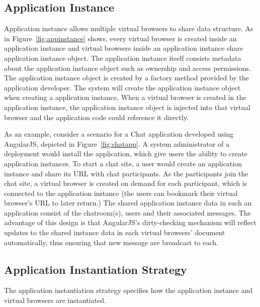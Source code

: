 \subsection{Application Instance}
\label{sec:appins}

\appinstancefig{}

Application instance allows multiple virtual browsers to share data structure.
As in Figure~\ref{fig:appinstance} shows, 
every virtual browser is created inside an application instance
and virtual browsers inside an application instance share application instance object.
The application instance itself
consists metadata about the application instance object
 such as ownership and access permissions.
The application instance object is created by a factory method provided by the application developer.
The system will create the application instance object when creating a application instance.
When a virtual browser is created in the application instance,
the application instance object is injected into that virtual browser
and the application code could reference it directly.


\chatappfig{}

As an example, consider a scenario for a Chat application developed using AngularJS,
depicted in Figure~\ref{fig:chatapp}.
A system administrator of a \cb deployment would install the application, which give users the
ability to create application instances. To start a chat site, a user would create
an application instance and share its URL with chat participants.  As the participants join
the chat site, a virtual browser is created on demand for each participant, which is connected
to the application instance (the users can bookmark their virtual browser's URL to later return.)
The shared application instance data in such an application
consist of the chatroom(s), users and their associated messages.  The advantage of this design
is that AngularJS's dirty-checking mechanism will reflect updates to the shared instance data
in each virtual browsers' document automatically, thus ensuring that new message are broadcast
to each.



\subsection{Application Instantiation Strategy}
\label{sec:appinstantiation}

The application instantiation strategy specifies
how the application instance and virtual browsers are instantiated.

